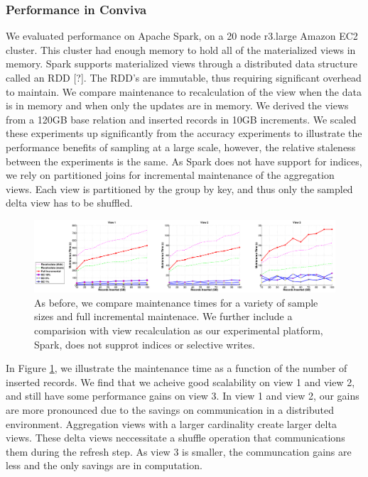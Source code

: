 \subsubsection{Performance in Conviva}
We evaluated performance on Apache Spark, on a 20 node r3.large Amazon EC2 cluster. 
This cluster had enough memory to hold all of the materialized views in memory.
Spark supports materialized views through a distributed data structure called an RDD [?].
The RDD's are immutable, thus requiring significant overhead to maintain.
We compare maintenance to recalculation of the view when the data is in memory and when only the updates are in memory. 
We derived the views from a 120GB base relation and inserted records in 10GB increments. 
We scaled these experiments up significantly from the accuracy experiments to illustrate the performance benefits of sampling at a large scale, however, the relative staleness between the experiments is the same.
As Spark does not have support for indices, we rely on partitioned joins for incremental maintenance of the aggregation views.
Each view is partitioned by the group by key, and thus only the sampled delta view has to be shuffled. 

\begin{figure}[ht!]
\label{exp6conviva}
\hspace{-2em}
\includegraphics[scale=0.23]{exp/exp5-efficiency-conviva.eps}
 \caption{As before, we compare maintenance times for a variety of sample sizes and full incremental maintenace. We further include a comparision with view recalculation as our experimental platform, Spark, does not supprot indices or selective writes.}
\end{figure}

In Figure \ref{exp6conviva}, we illustrate the maintenance time as a function of the number of inserted records.
We find that we acheive good scalability on view 1 and view 2, and still have some performance gains on view 3.
In view 1 and view 2, our gains are more pronounced due to the savings on communication in a distributed environment.
Aggregation views with a larger cardinality create larger delta views.
These delta views neccessitate a shuffle operation that communications them during the refresh step.
As view 3 is smaller, the communcation gains are less and the only savings are in computation.



